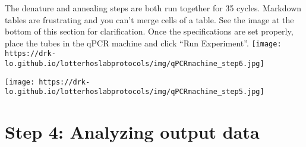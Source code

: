 \documentclass[
  letterpaper,
  DIV=11,
  numbers=noendperiod]{scrreprt}
\begin{document}
The denature and annealing steps are both run together for 35 cycles.
Markdown tables are frustrating and you can't merge cells of a table.
See the image at the bottom of this section for clarification. Once the
specifications are set properly, place the tubes in the qPCR machine and
click ``Run Experiment''.
\texttt{[image: https://drk-lo.github.io/lotterhoslabprotocols/img/qPCRmachine\_step6.jpg]}

\texttt{[image: https://drk-lo.github.io/lotterhoslabprotocols/img/qPCRmachine\_step5.jpg]}

\hypertarget{step-4-analyzing-output-data}{%
\section*{\texorpdfstring{\textbf{Step 4: Analyzing output
data}}{Step 4: Analyzing output data}}\label{step-4-analyzing-output-data}}

\end{document}
